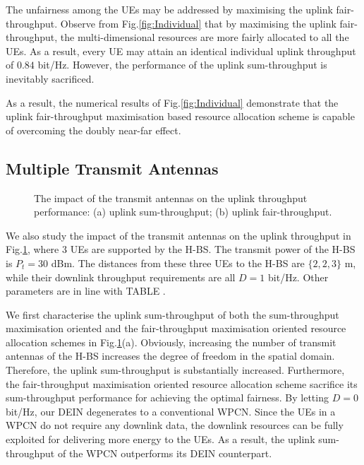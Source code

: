 \documentclass[12pt,draftcls,onecolumn,journal]{IEEEtran}
\begin{document}
The unfairness among the UEs may be addressed by maximising the uplink fair-throughput. Observe from Fig.\ref{fig:Individual} that by maximising the uplink fair-throughput, the multi-dimensional resources are more fairly allocated to all the UEs. As a result, every UE may attain an identical individual uplink throughput of $0.84$ bit/Hz. However, the performance of the uplink sum-throughput is inevitably sacrificed.

As a result, the numerical results of Fig.\ref{fig:Individual} demonstrate that the uplink fair-throughput maximisation based resource allocation scheme is capable of overcoming the doubly near-far effect.

\subsection{Multiple Transmit Antennas}

\begin{figure}[!t]
\setlength{\abovecaptionskip}{0pt}
\setlength{\belowcaptionskip}{0pt}\caption{The impact of the transmit antennas on the uplink throughput performance: (a) uplink sum-throughput; (b) uplink fair-throughput.}
\label{fig:Antenna}
\end{figure}

We also study the impact of the transmit antennas on the uplink throughput in Fig.\ref{fig:Antenna}, where 3 UEs are supported by the H-BS. The transmit power of the H-BS is $P_t = 30$ dBm. The distances from these three UEs to the H-BS are $\{2,2,3\}$ m, while their downlink throughput requirements are all $D=1$ bit/Hz. Other parameters are in line with TABLE \uppercase\expandafter{}.

We first characterise the uplink sum-throughput of both the sum-throughput maximisation oriented and the fair-throughput maximisation oriented resource allocation schemes in Fig.\ref{fig:Antenna}(a). Obviously, increasing the number of transmit antennas of the H-BS increases the degree of freedom in the spatial domain. Therefore, the uplink sum-throughput is substantially increased. Furthermore, the fair-throughput maximisation oriented resource allocation scheme sacrifice its sum-throughput performance for achieving the optimal fairness. By letting $D=0$ bit/Hz, our DEIN degenerates to a conventional WPCN. Since the UEs in a WPCN do not require any downlink data, the downlink resources can be fully exploited for delivering more energy to the UEs. As a result, the uplink sum-throughput of the WPCN outperforms its DEIN counterpart.
\end{document}
